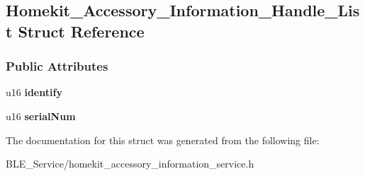 \hypertarget{struct_homekit___accessory___information___handle___list}{}\subsection{Homekit\+\_\+\+Accessory\+\_\+\+Information\+\_\+\+Handle\+\_\+\+List Struct Reference}
\label{struct_homekit___accessory___information___handle___list}
\subsubsection*{Public Attributes}
\begin{DoxyCompactItemize}
\item 
u16 {\bfseries identify}\hypertarget{struct_homekit___accessory___information___handle___list_ad97fc792402273585cc17ba20de78636}{}\label{struct_homekit___accessory___information___handle___list_ad97fc792402273585cc17ba20de78636}

\item 
u16 {\bfseries serial\+Num}\hypertarget{struct_homekit___accessory___information___handle___list_a879f711a6fce81b9faf2e1a835a1dc85}{}\label{struct_homekit___accessory___information___handle___list_a879f711a6fce81b9faf2e1a835a1dc85}

\end{DoxyCompactItemize}


The documentation for this struct was generated from the following file\+:\begin{DoxyCompactItemize}
\item 
B\+L\+E\+\_\+\+Service/homekit\+\_\+accessory\+\_\+information\+\_\+service.\+h\end{DoxyCompactItemize}
